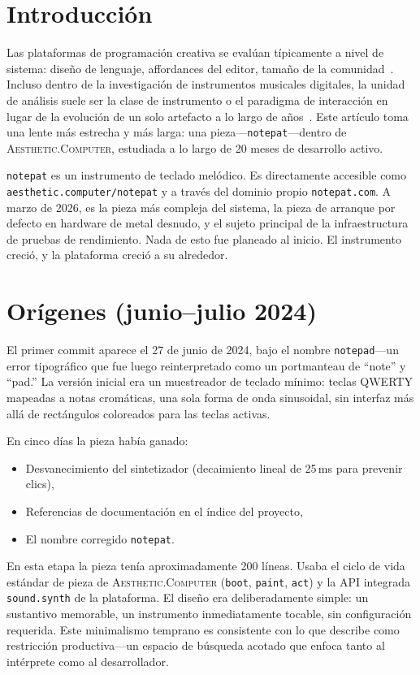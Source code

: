 \documentclass[10pt,letterpaper,twocolumn]{article}
\newcommand{\ac}{\textsc{Aesthetic.Computer}}
\begin{document}
\section{Introducción}

Las plataformas de programación creativa se evalúan típicamente a nivel de sistema: diseño de lenguaje, affordances del editor, tamaño de la comunidad~\citep{reas2007processing,mccarthy2015p5js,resnick2009scratch}. Incluso dentro de la investigación de instrumentos musicales digitales, la unidad de análisis suele ser la clase de instrumento o el paradigma de interacción en lugar de la evolución de un solo artefacto a lo largo de años~\citep{magnusson2010designing,marquez2018dmi}. Este artículo toma una lente más estrecha y más larga: una pieza---\texttt{notepat}---dentro de \ac{}, estudiada a lo largo de 20 meses de desarrollo activo.

\texttt{notepat} es un instrumento de teclado melódico. Es directamente accesible como \texttt{aesthetic.computer/notepat} y a través del dominio propio \texttt{notepat.com}. A marzo de 2026, es la pieza más compleja del sistema, la pieza de arranque por defecto en hardware de metal desnudo, y el sujeto principal de la infraestructura de pruebas de rendimiento. Nada de esto fue planeado al inicio. El instrumento creció, y la plataforma creció a su alrededor.

\section{Orígenes (junio--julio 2024)}

El primer commit aparece el 27 de junio de 2024, bajo el nombre \texttt{notepad}---un error tipográfico que fue luego reinterpretado como un portmanteau de ``note'' y ``pad.'' La versión inicial era un muestreador de teclado mínimo: teclas QWERTY mapeadas a notas cromáticas, una sola forma de onda sinusoidal, sin interfaz más allá de rectángulos coloreados para las teclas activas.

En cinco días la pieza había ganado:
\begin{itemize}
  \item Desvanecimiento del sintetizador (decaimiento lineal de 25\,ms para prevenir clics),
  \item Referencias de documentación en el índice del proyecto,
  \item El nombre corregido \texttt{notepat}.
\end{itemize}

En esta etapa la pieza tenía aproximadamente 200 líneas. Usaba el ciclo de vida estándar de pieza de \ac{} (\texttt{boot}, \texttt{paint}, \texttt{act}) y la API integrada \texttt{sound.synth} de la plataforma. El diseño era deliberadamente simple: un sustantivo memorable, un instrumento inmediatamente tocable, sin configuración requerida. Este minimalismo temprano es consistente con lo que \citet{magnusson2010designing} describe como restricción productiva---un espacio de búsqueda acotado que enfoca tanto al intérprete como al desarrollador.
\end{document}
